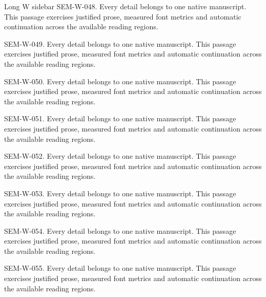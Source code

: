 \begin{m20sidebarwide}[columns=1,id=long-wide1]{Long W sidebar}
SEM-W-048. Every detail belongs to one native manuscript. This passage exercises justified prose, measured font metrics and automatic continuation across the available reading regions.\par
SEM-W-049. Every detail belongs to one native manuscript. This passage exercises justified prose, measured font metrics and automatic continuation across the available reading regions.\par
SEM-W-050. Every detail belongs to one native manuscript. This passage exercises justified prose, measured font metrics and automatic continuation across the available reading regions.\par
SEM-W-051. Every detail belongs to one native manuscript. This passage exercises justified prose, measured font metrics and automatic continuation across the available reading regions.\par
SEM-W-052. Every detail belongs to one native manuscript. This passage exercises justified prose, measured font metrics and automatic continuation across the available reading regions.\par
SEM-W-053. Every detail belongs to one native manuscript. This passage exercises justified prose, measured font metrics and automatic continuation across the available reading regions.\par
SEM-W-054. Every detail belongs to one native manuscript. This passage exercises justified prose, measured font metrics and automatic continuation across the available reading regions.\par
SEM-W-055. Every detail belongs to one native manuscript. This passage exercises justified prose, measured font metrics and automatic continuation across the available reading regions.\par
\end{m20sidebarwide}
